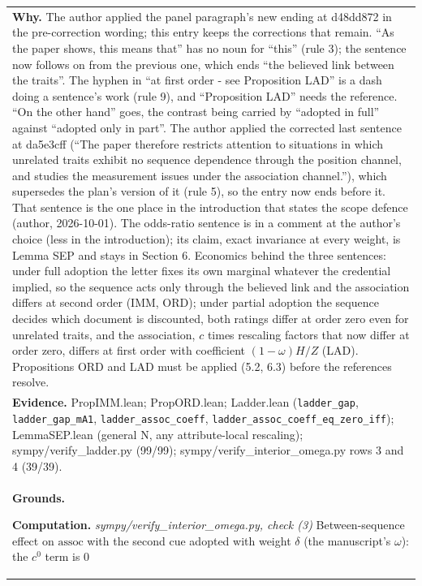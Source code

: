 \documentclass[10pt]{article}
\theoremstyle{definition}
\newlength{\fullw}\setlength{\fullw}{25.9cm}
\begin{document}
{\begin{longtable}{|p{0.9cm}|p{12.2cm}|p{12.2cm}|}
\multicolumn{3}{|p{\fullw}|}{\textbf{Why.} The author applied the panel paragraph's new ending at d48dd872 in the pre-correction wording; this entry keeps the corrections that remain. ``As the paper shows, this means that'' has no noun for ``this'' (rule 3); the sentence now follows on from the previous one, which ends ``the believed link between the traits''. The hyphen in ``at first order - see Proposition LAD'' is a dash doing a sentence's work (rule 9), and ``Proposition LAD'' needs the reference. ``On the other hand'' goes, the contrast being carried by ``adopted in full'' against ``adopted only in part''. The author applied the corrected last sentence at da5e3cff (``The paper therefore restricts attention to situations in which unrelated traits exhibit no sequence dependence through the position channel, and studies the measurement issues under the association channel.''), which supersedes the plan's version of it (rule 5), so the entry now ends before it. That sentence is the one place in the introduction that states the scope defence (author, 2026-10-01). The odds-ratio sentence is in a comment at the author's choice (less in the introduction); its claim, exact invariance at every weight, is Lemma SEP and stays in Section 6. Economics behind the three sentences: under full adoption the letter fixes its own marginal whatever the credential implied, so the sequence acts only through the believed link and the association differs at second order (IMM, ORD); under partial adoption the sequence decides which document is discounted, both ratings differ at order zero even for unrelated traits, and the association, $c$ times rescaling factors that now differ at order zero, differs at first order with coefficient $(1-\omega)H/Z$ (LAD). Propositions ORD and LAD must be applied (5.2, 6.3) before the references resolve.} \\
\multicolumn{3}{|p{\fullw}|}{\textbf{Evidence.} PropIMM.lean; PropORD.lean; Ladder.lean (\texttt{ladder\_gap}, \texttt{ladder\_gap\_mA1}, \texttt{ladder\_assoc\_coeff}, \texttt{ladder\_assoc\_coeff\_eq\_zero\_iff}); LemmaSEP.lean (general N, any attribute-local rescaling); sympy/verify\_ladder.py (99/99); sympy/verify\_interior\_omega.py rows 3 and 4 (39/39).} \\ \hline
\multicolumn{3}{|p{\fullw}|}{\textbf{Grounds.}\par \textbf{Computation.} \textit{sympy/verify\_interior\_omega.py, check (3)} \newline Between-sequence effect on $\mathrm{assoc}$ with the second cue
adopted with weight $\delta$ (the manuscript's $\omega$): the $c^0$ term is $0$
}
\end{longtable}}
\end{document}
